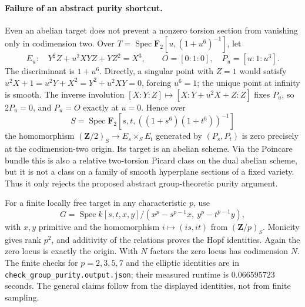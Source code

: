 \paragraph{Failure of an abstract purity shortcut.}
Even an abelian target does not prevent a nonzero torsion section from
vanishing only in codimension two. Over
$T=\operatorname{Spec}\mathbf F_2[u,(1+u^6)^{-1}]$, let
\[
 E_u:\quad Y^2Z+u^2XYZ+YZ^2=X^3,\qquad
 O=[0:1:0],\quad P_u=[u:1:u^3].
\]
The discriminant is $1+u^6$. Directly, a singular point with $Z=1$
would satisfy $u^2X+1=u^2Y+X^2=Y^2+u^2XY=0$, forcing $u^6=1$;
the unique point at infinity is smooth. The inverse involution
$[X:Y:Z]\mapsto[X:Y+u^2X+Z:Z]$ fixes $P_u$, so $2P_u=0$,
and $P_u=O$ exactly at $u=0$. Hence over
\[
 S=\operatorname{Spec}\mathbf F_2[s,t,((1+s^6)(1+t^6))^{-1}]
\]
the homomorphism $(\mathbf Z/2)_S\to E_s\times_SE_t$ generated
by $(P_s,P_t)$ is zero precisely at the codimension-two origin.
Its target is an abelian scheme. Via the Poincare bundle this is also
a relative two-torsion Picard class on the dual abelian scheme, but
it is not a class on a family of smooth hyperplane sections of a fixed
variety. Thus it only rejects the proposed abstract group-theoretic
purity argument.

For a finite locally free target in any characteristic $p$, use
\[
 G=\operatorname{Spec}k[s,t,x,y]/
 (x^p-s^{p-1}x,\ y^p-t^{p-1}y),
\]
with $x,y$ primitive and the homomorphism $i\mapsto(is,it)$ from
$(\mathbf Z/p)_S$. Monicity gives rank $p^2$, and additivity of the
relations proves the Hopf identities. Again the zero locus is exactly
the origin. With $N$ factors the zero locus has codimension $N$.
The finite checks for $p=2,3,5,7$ and the elliptic identities are in
\texttt{check\_group\_purity.output.json}; their measured runtime is
$0.066595723$ seconds. The general claims follow from the displayed
identities, not from finite sampling.
